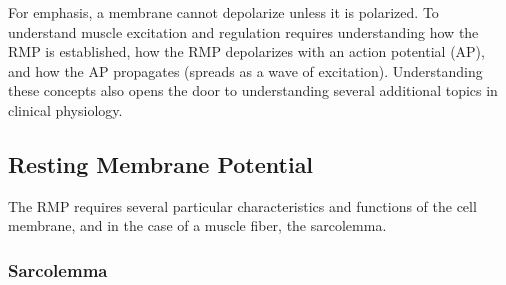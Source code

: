For emphasis, a membrane cannot depolarize unless it is polarized. To understand muscle excitation and regulation\footnotemark{} requires understanding how the RMP is established, how the RMP depolarizes with an action potential (AP), and how the AP propagates (spreads as a wave of excitation). Understanding these concepts also opens the door to understanding several additional topics in clinical physiology. 



\subsection{Resting Membrane Potential}

The RMP requires several particular characteristics and functions of the cell membrane, and in the case of a muscle fiber, the sarcolemma.

\subsubsection{Sarcolemma}

